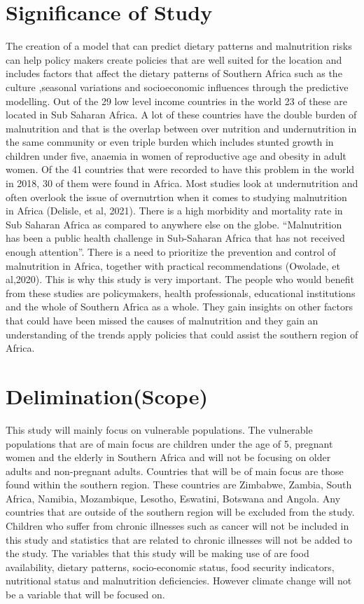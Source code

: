 \documentclass[a4paper,11pt]{report}
\begin{document}
	\section{Significance of Study}
	The creation of a model that can predict dietary patterns and malnutrition risks can help policy makers create policies that are well suited for the location and includes factors that affect the dietary patterns of Southern Africa such as the culture ,seasonal variations and socioeconomic influences through the predictive modelling. Out of the 29 low level income countries in the world 23 of these are located in Sub Saharan Africa. A lot of these countries have the double burden of malnutrition and that is the overlap between over nutrition and undernutrition in the same community or even triple burden which includes stunted growth in children under five, anaemia in women of reproductive age and obesity in adult women. Of the 41 countries that were recorded to have this problem in the world in 2018, 30 of them were found in Africa. Most studies look at undernutrition and often overlook the issue of overnutrtion when it comes to studying malnutrition in Africa (Delisle, et al, 2021). There is a high morbidity and mortality rate in Sub Saharan Africa as compared to anywhere else on the globe.  “Malnutrition has been a public health challenge in Sub-Saharan Africa that has not received enough attention”. There is a need to prioritize the prevention and control of malnutrition in Africa, together with practical recommendations (Owolade, et al,2020). This is why this study is very important. The people who would benefit from these studies are policymakers, health professionals, educational institutions and the whole of Southern Africa as a whole. They gain insights on other factors that could have been missed the causes of malnutrition and they gain an understanding of the trends  apply policies that could assist the southern region of Africa.
	
	\section{Delimination(Scope)}
	This study will mainly focus on vulnerable populations. The vulnerable populations that are of main focus are children under the age of 5, pregnant women  and the elderly in Southern Africa and will not be focusing on older adults and non-pregnant adults. Countries that will be of main focus are those found within the southern region. These countries are Zimbabwe, Zambia, South Africa, Namibia, Mozambique, Lesotho, Eswatini, Botswana and Angola. Any countries that are outside of the southern region will be excluded from the study. Children who suffer from chronic illnesses such as cancer will not be included in this study and statistics that are related to chronic illnesses will not be added to the study. The variables that this study will be making use of are food availability, dietary patterns, socio-economic status, food security indicators, nutritional status and malnutrition deficiencies. However climate change will not be a variable that will be focused on.
	
\end{document}
